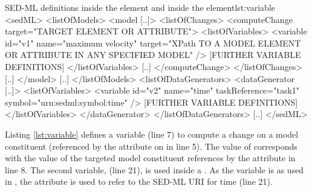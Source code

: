 %

%
\begin{myXmlLst}{SED-ML  definitions inside the  element and inside the  element}{lst:variable}
<sedML>
 <listOfModels>
  <model [..]>
   <listOfChanges>
    <computeChange target="TARGET ELEMENT OR ATTRIBUTE">
     <listOfVariables>
       <variable id="v1" name="maximum velocity" 
        target="XPath TO A MODEL ELEMENT OR ATTRIBUTE IN ANY SPECIFIED MODEL" />
      [FURTHER VARIABLE DEFINITIONS]
     </listOfVariables>
     [..]
    </computeChange>
   </listOfChanges>
   [..]
  </model>
  [..]
 </listOfModels>
 <listOfDataGenerators>
  <dataGenerator [..]>
   <listOfVariables>
    <variable id="v2" name="time" taskReference="task1" symbol="urn:sedml:symbol:time" />
      [FURTHER VARIABLE DEFINITIONS]
   </listOfVariables>
  </dataGenerator>
 </listOfDataGenerators>
 [..]
</sedML>
\end{myXmlLst}
%
Listing \ref{lst:variable} defines a variable  (line 7) to compute a change on a model constituent (referenced by the  attribute on  in line 5). The value of  corresponds with the value of the targeted model constituent references by the  attribute in line 8. 
The second variable,  (line 21), is used inside a . As the variable is  as used in  , the  attribute is used to refer to the SED-ML URI for time (line 21).






%


